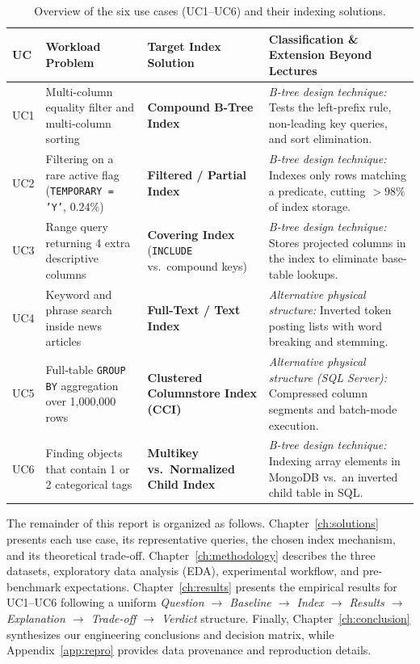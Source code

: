 \begin{table}[H]
\centering\small
\caption{Overview of the six use cases (UC1--UC6) and their indexing solutions.}
\label{tab:uc-summary}
\begin{tabularx}{\linewidth}{@{}l >{\raggedright\arraybackslash}p{4.3cm} >{\raggedright\arraybackslash}p{3.9cm} >{\raggedright\arraybackslash}X@{}}
\toprule
UC & Workload Problem & Target Index Solution & Classification \& Extension Beyond Lectures\\
\midrule
UC1 & Multi-column equality filter and multi-column sorting & \textbf{Compound B-Tree Index} & \emph{B-tree design technique:} Tests the left-prefix rule, non-leading key queries, and sort elimination.\\
UC2 & Filtering on a rare active flag (\texttt{TEMPORARY = 'Y'}, $0.24\%$) & \textbf{Filtered / Partial Index} & \emph{B-tree design technique:} Indexes only rows matching a predicate, cutting $>98\%$ of index storage.\\
UC3 & Range query returning 4 extra descriptive columns & \textbf{Covering Index} (\texttt{INCLUDE} vs.\ compound keys) & \emph{B-tree design technique:} Stores projected columns in the index to eliminate base-table lookups.\\
UC4 & Keyword and phrase search inside news articles & \textbf{Full-Text / Text Index} & \emph{Alternative physical structure:} Inverted token posting lists with word breaking and stemming.\\
UC5 & Full-table \texttt{GROUP BY} aggregation over 1,000,000 rows & \textbf{Clustered Columnstore Index (CCI)} & \emph{Alternative physical structure (SQL Server):} Compressed column segments and batch-mode execution.\\
UC6 & Finding objects that contain 1 or 2 categorical tags & \textbf{Multikey vs.\ Normalized Child Index} & \emph{B-tree design technique:} Indexing array elements in MongoDB vs.\ an inverted child table in SQL.\\
\bottomrule
\end{tabularx}
\end{table}

The remainder of this report is organized as follows. Chapter~\ref{ch:solutions} presents each use case, its representative queries, the chosen index mechanism, and its theoretical trade-off. Chapter~\ref{ch:methodology} describes the three datasets, exploratory data analysis (EDA), experimental workflow, and pre-benchmark expectations. Chapter~\ref{ch:results} presents the empirical results for UC1--UC6 following a uniform \emph{Question $\rightarrow$ Baseline $\rightarrow$ Index $\rightarrow$ Results $\rightarrow$ Explanation $\rightarrow$ Trade-off $\rightarrow$ Verdict} structure. Finally, Chapter~\ref{ch:conclusion} synthesizes our engineering conclusions and decision matrix, while Appendix~\ref{app:repro} provides data provenance and reproduction details.
\FloatBarrier
